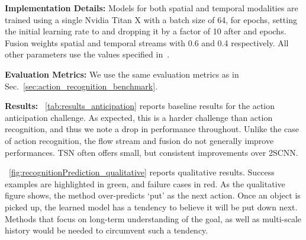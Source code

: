 \documentclass[runningheads]{llncs}
\begin{document}
\noindent\textbf{Implementation Details:} Models for both spatial and temporal modalities are trained using a single Nvidia Titan X with a batch size of 64, for  epochs, setting the initial learning rate to  and dropping it by a factor of 10 after  and  epochs. Fusion weights spatial and temporal streams with 0.6 and 0.4 respectively. All other parameters use the values specified in~\cite{wang2016tsn}.

\noindent\textbf{Evaluation Metrics:}
We use the same evaluation metrics as in Sec.~\ref{sec:action_recognition_benchmark}.

\noindent\textbf{Results:}
\tablename~\ref{tab:results_anticipation} reports baseline results for the action anticipation challenge. 
As expected, this is a harder challenge than action recognition, and thus we note a drop in performance throughout. Unlike the case of action recognition, the flow stream and fusion do not generally improve performances. TSN often offers small, but consistent improvements over 2SCNN.

\figurename~\ref{fig:recognitionPrediction_qualitative} reports qualitative results. Success examples are highlighted in green, and failure cases in red.
As the qualitative figure shows, the method over-predicts `put' as the next action. Once an object is picked up, the learned model has a tendency to believe it will be put down next. Methods that focus on long-term understanding of the goal, as well as multi-scale history would be needed to circumvent such a tendency. 
\end{document}
